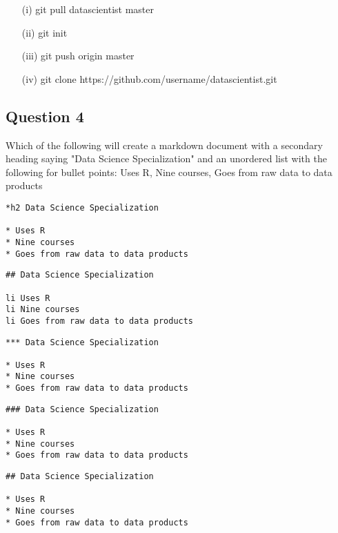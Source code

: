 \documentclass[12pt]{article}
\begin{document}
\begin{itemize}
\item[(i)] git pull datascientist master
\item[(ii)] git init
\item[(iii)] git push origin master
\item[(iv)] git clone https://github.com/username/datascientist.git
\end{itemize}
\subsection*{Question 4}
Which of the following will create a markdown document with a secondary heading saying "Data Science Specialization" and an unordered list with the following for bullet points: Uses R, Nine courses, Goes from raw data to data products
\begin{framed}
\begin{verbatim}
*h2 Data Science Specialization 

* Uses R 
* Nine courses 
* Goes from raw data to data products
\end{verbatim}
\end{framed}

\begin{framed}
\begin{verbatim}
## Data Science Specialization 

li Uses R 
li Nine courses 
li Goes from raw data to data products
\end{verbatim}
\end{framed}

\begin{framed}
\begin{verbatim}
*** Data Science Specialization 

* Uses R 
* Nine courses 
* Goes from raw data to data products
\end{verbatim}
\end{framed}

\begin{framed}
\begin{verbatim}
### Data Science Specialization 

* Uses R 
* Nine courses 
* Goes from raw data to data products
\end{verbatim}
\end{framed}

\begin{framed}
\begin{verbatim}
## Data Science Specialization 

* Uses R 
* Nine courses 
* Goes from raw data to data products
\end{verbatim}
\end{framed}
\end{document}
